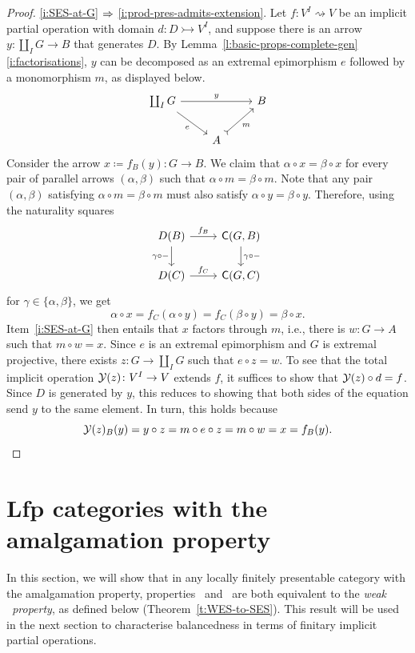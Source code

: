 \documentclass[a4paper,10pt,reqno]{amsart}
\theoremstyle{definition}
\theoremstyle{remark}
\begin{document}
\begin{proof}
\ref{i:SES-at-G} $\Rightarrow$ \ref{i:prod-pres-admits-extension}. Let $f\colon V^{I}\rightsquigarrow V$ be an implicit partial operation with domain $d\colon D\rightarrowtail V^{I}$, and suppose there is an arrow $y\colon \coprod_{I}G \to B$ that generates $D$. By Lemma~\ref{l:basic-props-complete-gen}\ref{i:factorisations}, $y$ can be decomposed as an extremal epimorphism $e$ followed by a monomorphism $m$, as displayed below.
\[\begin{tikzcd}
\coprod_{I}{G} \arrow{rr}{y} \arrow{dr}[swap]{e} & & B \\
& A \arrow[rightarrowtail]{ur}[swap]{m}
\end{tikzcd}\]
Consider the arrow $x\coloneqq f_{B}(y)\colon G\to B$. We claim that $\alpha\circ x = \beta\circ x$ for every pair of parallel arrows $(\alpha,\beta)$ such that $\alpha\circ m = \beta\circ m$. Note that any pair $(\alpha,\beta)$ satisfying $\alpha\circ m = \beta\circ m$ must also satisfy $\alpha\circ y = \beta\circ y$. Therefore, using the naturality squares
\[\begin{tikzcd}
D(B) \arrow{r}{f_{B}} \arrow{d}[swap]{\gamma\circ -} & \cat(G,B) \arrow{d}{\gamma\circ -} \\
D(C) \arrow{r}{f_{C}} & \cat(G,C)
\end{tikzcd}\]
for $\gamma\in \{\alpha,\beta\}$, we get
\[
\alpha\circ x = f_{C}(\alpha\circ y) = f_{C}(\beta\circ y) = \beta\circ x.
\]
Item~\ref{i:SES-at-G} then entails that $x$ factors through $m$, i.e., there is $w\colon G\to A$ such that $m\circ w = x$. Since $e$ is an extremal epimorphism and $G$ is extremal projective, there exists $z\colon G\to \coprod_{I}{G}$ such that $e\circ z = w$. To see that the total implicit operation $\mathcal{Y}(z)\colon V^{I}\to V$ extends $f$, it suffices to show that $\mathcal{Y}(z)\circ d = f$. Since $D$ is generated by $y$, this reduces to showing that both sides of the equation send $y$ to the same element. In turn, this holds because
\[
\mathcal{Y}(z)_{B}(y) = y\circ z = m\circ e \circ z = m\circ w = x = f_{B}(y).\qedhere
\] 
\end{proof}


\section{Lfp categories with the amalgamation property}\label{s:lfps-with-AP}

In this section, we will show that in any locally finitely presentable category with the amalgamation property, properties \ES~and \SES~are both equivalent to the \emph{weak \ES~property}, as defined below (Theorem~\ref{t:WES-to-SES}). This result will be used in the next section to characterise balancedness in terms of finitary implicit partial operations.
\end{document}
